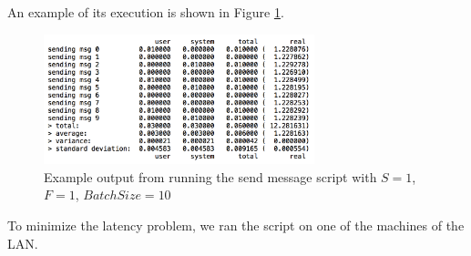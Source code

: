An example of its execution is shown in Figure \ref{send-msg-output}.

\begin{figure}[htb]
	\centering
	\includegraphics[width=0.7\textwidth]{images/send-msg-output}
	\caption{Example output from running the send message script with $S = 1$, $F = 1$, $BatchSize = 10$}
	\label{send-msg-output}
\end{figure}

To minimize the latency problem, we ran the  script on one of the machines of the LAN.